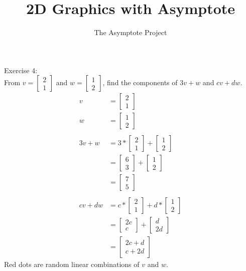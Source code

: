 \documentclass[12pt]{article}
\title{2D Graphics with Asymptote}
\author{The Asymptote Project}
\newcommand{\insertrep}[1]{%
	\hspace*{-2.4cm}
	\fbox{\texttt{[image: \#1]}}
}
\begin{document}
Exercise 4:\\
From $v=\begin{bmatrix}2\\1\end{bmatrix}$ and $w=\begin{bmatrix}1\\2\end{bmatrix}$, find the components of $3v+w$ and $cv+dw$.\\
\begin{align*}
	v&=\begin{bmatrix}2\\1\end{bmatrix}\\
	w&=\begin{bmatrix}1\\2\end{bmatrix}\\
	\\
	3v+w &= 3*\begin{bmatrix}2\\1\end{bmatrix} + \begin{bmatrix}1\\2\end{bmatrix}\\
	&=\begin{bmatrix}6\\3\end{bmatrix}+\begin{bmatrix}1\\2\end{bmatrix}\\
	&=\begin{bmatrix}7\\5\end{bmatrix}\\
	\\
	cv+dw &= c*\begin{bmatrix}2\\1\end{bmatrix} + d*\begin{bmatrix}1\\2\end{bmatrix}\\
	&= \begin{bmatrix}2c\\c\end{bmatrix} + \begin{bmatrix}d\\2d\end{bmatrix}\\
	&= \begin{bmatrix}2c+d\\c+2d\end{bmatrix}
\end{align*}
\newpage
Red dots are random linear combinations of $v$ and $w$.
\begin{center}
	\insertrep{exercise01004.pdf}
\end{center}
\end{document}
